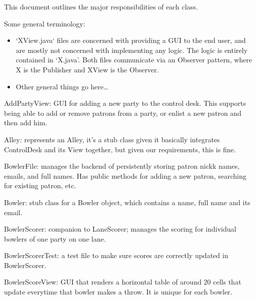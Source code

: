 This document outlines the major responsibilities of each class.

Some general terminology:

\begin{itemize}
    \item `XView.java` files are concerned with providing a GUI to the end user, and are mostly not concerned with implementing any logic. The logic is entirely contained in `X.java'. Both files communicate via an Observer pattern, where X is the Publisher and XView is the Observer.
    \item Other general things go here\dots
\end{itemize}

AddPartyView: GUI for adding a new party to the control desk. This supports being able to add or remove patrons from a party, or enlist a new patron and then add him.

Alley: represents an Alley, it's a stub class given it basically integrates ControlDesk and its View together, but given our requirements, this is fine.

BowlerFile: manages the backend of persistently storing patron nickk names, emails, and full names. Has public methods for adding a new patron, searching for existing patron, etc.

Bowler: stub class for a Bowler object, which contains a name, full name and its email.

BowlerScorer: companion to LaneScorer; manages the scoring for individual bowlers of one party on one lane.

BowlerScorerTest: a test file to make sure scores are correctly updated in BowlerScorer.

BowlerScoreView: GUI that renders a horizontal table of around 20 cells that update everytime that bowler makes a throw. It is unique for each bowler.

